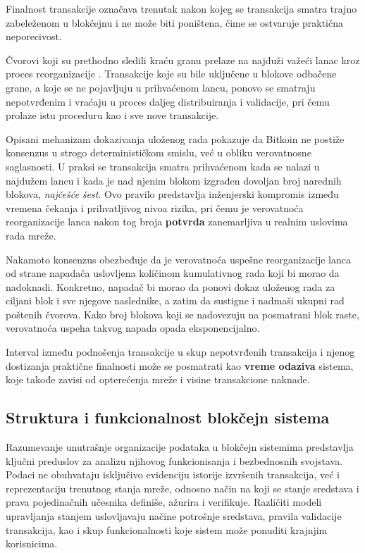 \begin{definicija}
Finalnost  transakcije označava trenutak nakon kojeg se transakcija smatra trajno zabeleženom u blokčejnu i ne može biti poništena, čime se ostvaruje praktična neporecivost.
\end{definicija}

Čvorovi koji su prethodno sledili kraću granu prelaze na najduži važeći lanac kroz proces reorganizacije . Transakcije koje su bile uključene u blokove odbačene grane, a koje se ne pojavljuju u prihvaćenom lancu, ponovo se smatraju nepotvrđenim i vraćaju u proces daljeg distribuiranja i validacije, pri čemu prolaze istu proceduru kao i sve nove transakcije.

Opisani mehanizam dokazivanja uloženog rada pokazuje da Bitkoin ne postiže konsenzus u strogo determinističkom smislu, već u obliku verovatnosne saglasnosti. U praksi se transakcija smatra prihvaćenom kada se nalazi u najdužem lancu i kada je nad njenim blokom izgrađen dovoljan broj narednih blokova, \textit{najčešće šest}. Ovo pravilo predstavlja inženjerski kompromis između vremena čekanja i prihvatljivog nivoa rizika, pri čemu je verovatnoća reorganizacije lanca nakon tog broja \textbf{potvrda} zanemarljiva u realnim uslovima rada mreže.

Nakamoto konsenzus obezbeđuje da je verovatnoća uspešne reorganizacije lanca od strane napadača uslovljena količinom kumulativnog rada koji bi morao da nadoknadi. Konkretno, napadač bi morao da ponovi dokaz uloženog rada za ciljani blok i sve njegove naslednike, a zatim da sustigne i nadmaši ukupni rad poštenih čvorova. Kako broj blokova koji se nadovezuju na posmatrani blok raste, verovatnoća uspeha takvog napada opada eksponencijalno.

Interval između podnošenja transakcije u skup nepotvrđenih transakcija i njenog dostizanja praktične finalnosti može se posmatrati kao \textbf{vreme odaziva} sistema, koje takođe zavisi od opterećenja mreže i visine transakcione naknade.

\subsection{Struktura i funkcionalnost blokčejn sistema}
Razumevanje unutrašnje organizacije podataka u blokčejn sistemima predstavlja ključni preduslov za analizu njihovog funkcionisanja i bezbednosnih svojstava. Podaci ne obuhvataju isključivo evidenciju istorije izvršenih transakcija, već i reprezentaciju trenutnog stanja mreže, odnosno način na koji se stanje sredstava i prava pojedinačnih učesnika definiše, ažurira i verifikuje. Različiti modeli upravljanja stanjem uslovljavaju načine potrošnje sredstava, pravila validacije transakcija, kao i skup funkcionalnosti koje sistem može ponuditi krajnjim korisnicima.

